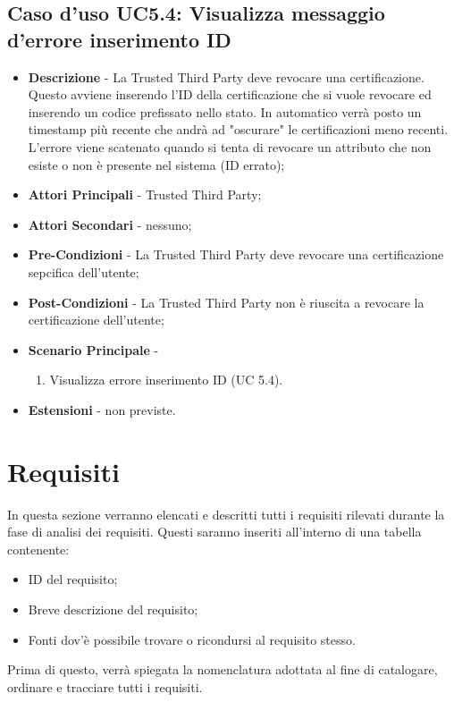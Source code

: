 \subsection{Caso d'uso UC5.4: Visualizza messaggio d'errore inserimento ID}
\begin{itemize}
	\item \textbf{Descrizione} - La Trusted Third Party deve revocare una certificazione.\\
	Questo avviene inserendo l'ID della certificazione che si vuole revocare ed inserendo un codice prefissato nello stato. In automatico verrà posto un timestamp più recente che andrà ad "oscurare" le certificazioni meno recenti.\\
	L'errore viene scatenato quando si tenta di revocare un attributo che non esiste o non è presente nel sistema (ID errato);	
	\item \textbf{Attori Principali} - Trusted Third Party;
	\item \textbf{Attori Secondari} - nessuno;
	\item \textbf{Pre-Condizioni} - La Trusted Third Party deve revocare una certificazione sepcifica dell'utente;
	\item \textbf{Post-Condizioni} - La Trusted Third Party non è riuscita a revocare la certificazione dell'utente;
	\item \textbf{Scenario Principale} -
	\begin{enumerate}
		\item Visualizza errore inserimento ID (UC 5.4).
	\end{enumerate}
	\item \textbf{Estensioni} - non previste.
\end{itemize}
\section{Requisiti}
In questa sezione verranno elencati e descritti tutti i requisiti rilevati durante la fase di analisi dei requisiti. Questi saranno inseriti all'interno di una tabella contenente:
\begin{itemize}
	\item ID del requisito;
	\item Breve descrizione del requisito;
	\item Fonti dov'è possibile trovare o ricondursi al requisito stesso.
\end{itemize}
Prima di questo, verrà spiegata la nomenclatura adottata al fine di catalogare, ordinare e tracciare tutti i requisiti.
